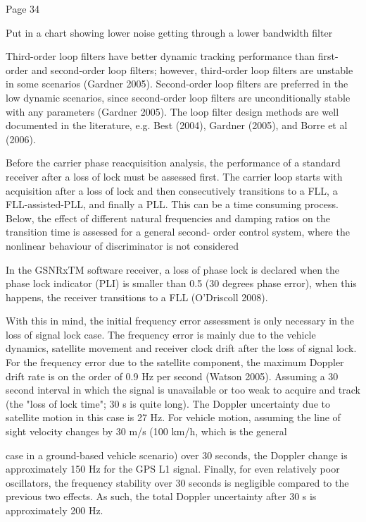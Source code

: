 Page 34 

Put in a chart showing lower noise getting through a lower bandwidth filter

Third-order loop filters have better dynamic tracking performance than first-order and second-order loop filters; however, third-order loop filters are unstable in some scenarios (Gardner 2005). Second-order loop filters are preferred in the low dynamic scenarios, since second-order loop filters are unconditionally stable with any parameters (Gardner 2005). The loop filter design methods are well documented in the literature, e.g. Best
(2004), Gardner (2005), and Borre et al (2006).

Before the carrier phase reacquisition analysis, the performance of a standard receiver after a loss of lock must be assessed first. The carrier loop starts with acquisition after a loss of lock and then consecutively transitions to a FLL, a FLL-assisted-PLL, and finally a PLL. This can be a time consuming process. Below, the effect of different natural frequencies and damping ratios on the transition time is assessed for a general second- order control system, where the nonlinear behaviour of discriminator is not considered

In the GSNRxTM software receiver, a loss of phase lock is declared when the phase lock indicator (PLI) is smaller than 0.5 (30 degrees phase error), when this happens, the receiver transitions to a FLL (O'Driscoll 2008).

With this in mind, the initial frequency error assessment is only necessary in the loss of signal lock case. The frequency error is mainly due to the vehicle dynamics, satellite movement and receiver clock drift after the loss of signal lock. For the frequency error due to the satellite component, the maximum Doppler drift rate is on the order of 0.9 Hz per second (Watson 2005). Assuming a 30 second interval in which the signal is unavailable or too weak to acquire and track (the "loss of lock time"; 30 s is quite long). The Doppler uncertainty due to satellite motion in this case is 27 Hz. For vehicle motion, assuming the line of sight velocity changes by 30 m/s (100 km/h, which is the general


case in a ground-based vehicle scenario) over 30 seconds, the Doppler change is approximately 150 Hz for the GPS L1 signal. Finally, for even relatively poor oscillators,
the frequency stability over 30 seconds is negligible compared to the previous two effects. As such, the total Doppler uncertainty after 30 s is approximately 200 Hz.



